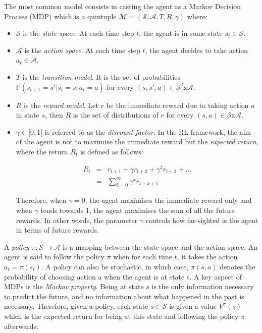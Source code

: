         The most common model consists in casting the agent as a Markov Decision Process (MDP) which is a quintuple $\mathcal{M} = (\mathcal{S},\mathcal{A},T,R,\gamma)$ where:
        \begin{itemize}
            \item $\mathcal{S}$ is the \textit{state space}. At each time step $t$, the agent is in some state $s_t \in \mathcal{S}$.
            \item $\mathcal{A}$ is the \textit{action space}. At each time step $t$, the agent decides to take action $a_t \in \mathcal{A}$.
            \item $T$ is the \textit{transition model}. It is the set of probabilities $\mathbb{P} (s_{t+1} = s'|s_t = s, a_t=a)$ for every $(s,s',a) \in \mathcal{S}^2 \text{x} \mathcal{A}$.
            \item $R$ is the \textit{reward model}. Let $r$ be the immediate reward due to taking action $a$ in state $s$, then $R$ is the set of distributions of $r$ for every $(s,a) \in \mathcal{S} \text{x} \mathcal{A}$.
            \item $\gamma \in [0,1[$ is referred to as the \textit{discount factor}. In the RL framework, the aim of the agent is not to maximise the immediate reward but the \textit{expected return}, where the return $R_t$ is defined as follows:
						
						\begin{eqnarray}
							R_t & = & r_{t+1} + \gamma r_{t+2} + \gamma^2 r_{t+3} + ... \nonumber \\
							& = & \sum_{k=0}^\infty \gamma^k r_{t+k+1} \label{eq:return}
						\end{eqnarray}
            
            Therefore, when $\gamma = 0$, the agent maximises the immediate reward only and when $\gamma$ tends towards 1, the agent maximises the sum of all the future rewards. In other words, the parameter $\gamma$ controls how far-sighted is the agent in terms of future rewards.
		\end{itemize}
        
        A \textit{policy} $\pi : \mathcal{S} \rightarrow \mathcal{A}$ is a mapping between the state space and the action space. An agent is said to follow the policy $\pi$ when for each time $t$, it takes the action $a_t = \pi(s_t)$. A policy can also be stochastic, in which case, $\pi (s,a)$ denotes the probability of choosing action a when the agent is at state s. A key aspect of MDPs is the \textit{Markov property}. Being at state $s$ is the only information necessary to predict the future, and no information about what happened in the past is necessary. Therefore, given a policy, each state $s \in \mathcal{S}$ is given a value $V^\pi (s)$ which is the expected return for being at this state and following the policy $\pi$ afterwards:
					
